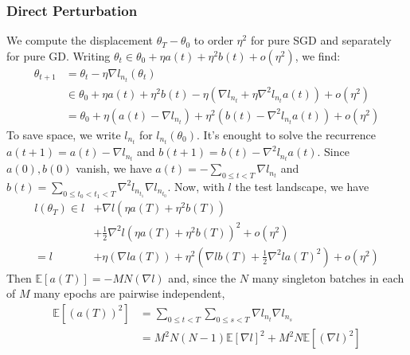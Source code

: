 \documentclass{article}
\newcommand{\expct}[1]{\mathbb{E}\left[#1\right]}
\begin{document}
        \subsubsection*{Direct Perturbation} 
        We compute the displacement $\theta_T-\theta_0$ to order $\eta^2$ 
        for pure SGD and separately for pure GD.  Writing
        $
            \theta_t \in \theta_0 + \eta a(t) + \eta^2 b(t) + o(\eta^2)
        $, we find:
        \begin{align*}
            \theta_{t+1} &=     \theta_t - \eta \nabla l_{n_t} (\theta_t) \\
                         &\in       \theta_0
                                +   \eta a(t) + \eta^2 b(t)
                                -   \eta (
                                            \nabla l_{n_t}
                                        +   \eta \nabla^2 l_{n_t} a(t) 
                                    )
                                +   o(\eta^2) \\
                         &=     \theta_0
                            +   \eta (a(t) - \nabla l_{n_t})
                            +   \eta^2 (b(t) - \nabla^2 l_{n_t} a(t)) 
                            +   o(\eta^2)
        \end{align*}
        To save space, we write $l_{n_t}$ for $l_{n_t}(\theta_0)$.
        It's enought to solve the recurrence $a(t+1) = a(t) - \nabla l_{n_t}$
        and $b(t+1) = b(t) - \nabla^2 l_{n_t} a(t)$.  Since $a(0), b(0)$
        vanish, we have $a(t) =-\sum_{0\leq t<T} \nabla l_{n_t}$ and $b(t) =
        \sum_{0\leq t_0 < t_1 < T} \nabla^2 l_{n_{t_1}} \nabla l_{n_{t_0}}$.
        Now, with $l$ the test landscape, we have
        \begin{align*}
            l(\theta_T) \in    l   &+   \nabla l (\eta a(T) + \eta^2 b(T)) \\
                                   &+   \frac{1}{2} \nabla^2 l (\eta a(T) + \eta^2 b(T))^2
                                    +   o(\eta^2) \\
                        =      l   &+   \eta (\nabla l a(T))
                                    +   \eta^2 (\nabla l b(T) + \frac{1}{2} \nabla^2 l a(T)^2 )
                                    +   o(\eta^2)
        \end{align*}
        Then $\expct{a(T)} = -MN(\nabla l)$ and, since the $N$ many
        singleton batches in each of $M$ many epochs are pairwise independent,
        \begin{align*}
            \expct{(a(T))^2}
            &=
            \sum_{0\leq t<T} \sum_{0\leq s<T} \nabla l_{n_t} \nabla l_{n_s} \\
            &= 
            M^2N(N-1)   \expct{\nabla l}^2 +
            M^2N        \expct{(\nabla l)^2}
        \end{align*}
\end{document}
